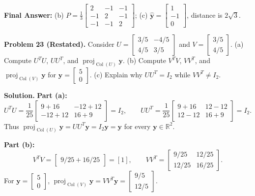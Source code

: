 \documentclass[11pt, letterpaper]{article}
\theoremstyle{definition}
\theoremstyle{remark}
\newcommand{\R}{\mathbb{R}}
\begin{document}
\textbf{Final Answer:} (b) $P = \frac{1}{3}\begin{bmatrix} 2 & -1 & -1 \\ -1 & 2 & -1 \\ -1 & -1 & 2 \end{bmatrix}$; (c) $\hat{\mathbf{y}} = \begin{bmatrix} 1 \\ -1 \\ 0 \end{bmatrix}$, distance is $2\sqrt{3}$.

\medskip
\textbf{Problem 23 (Restated).} Consider $U = \begin{bmatrix} 3/5 & -4/5 \\ 4/5 & 3/5 \end{bmatrix}$ and $V = \begin{bmatrix} 3/5 \\ 4/5 \end{bmatrix}$. (a) Compute $U^T U$, $UU^T$, and $\operatorname{proj}_{\operatorname{Col}(U)} \mathbf{y}$. (b) Compute $V^T V$, $VV^T$, and $\operatorname{proj}_{\operatorname{Col}(V)} \mathbf{y}$ for $\mathbf{y} = \begin{bmatrix} 5 \\ 0 \end{bmatrix}$. (c) Explain why $UU^T = I_2$ while $VV^T \neq I_2$.

\textbf{Solution.}
\textbf{Part (a):}
\[
U^T U = \frac{1}{25}\begin{bmatrix} 9+16 & -12+12 \\ -12+12 & 16+9 \end{bmatrix} = I_2, \qquad UU^T = \frac{1}{25}\begin{bmatrix} 9+16 & 12-12 \\ 12-12 & 16+9 \end{bmatrix} = I_2.
\]
Thus $\operatorname{proj}_{\operatorname{Col}(U)} \mathbf{y} = UU^T\mathbf{y} = I_2\mathbf{y} = \mathbf{y}$ for every $\mathbf{y} \in \R^2$.

\textbf{Part (b):}
\[
V^T V = \begin{bmatrix} 9/25 + 16/25 \end{bmatrix} = [1], \qquad VV^T = \begin{bmatrix} 9/25 & 12/25 \\ 12/25 & 16/25 \end{bmatrix}.
\]
For $\mathbf{y} = \begin{bmatrix} 5 \\ 0 \end{bmatrix}$, $\operatorname{proj}_{\operatorname{Col}(V)} \mathbf{y} = VV^T\mathbf{y} = \begin{bmatrix} 9/5 \\ 12/5 \end{bmatrix}$.
\end{document}
